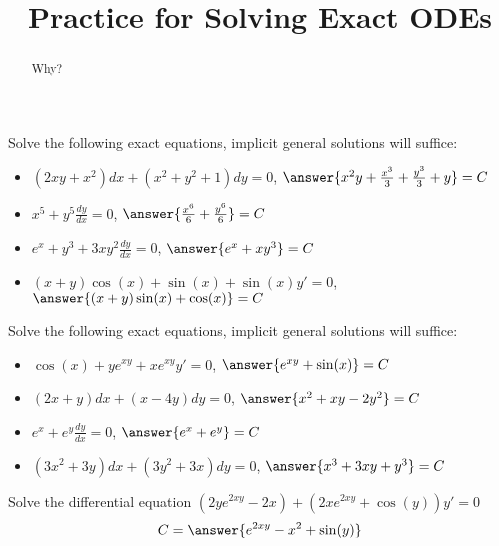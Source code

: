 \documentclass{ximera}
\title{Practice for Solving Exact ODEs}
\begin{document}
\begin{abstract}
    Why?
\end{abstract}
\maketitle

\begin{exercise}
    Solve the following exact equations, implicit general solutions will suffice:
    \begin{itemize}
        \item $(2 xy + x^2) dx + (x^2+y^2+1) dy = 0$, $\answer{x^2y + \frac{x^3}{3} + \frac{y^3}{3} + y} = C$
        \item $x^5 + y^5 \frac{dy}{dx} = 0$, $\answer{\frac{x^6}{6} + \frac{y^6}{6}} = C$
        \item $e^x+y^3 + 3xy^2 \frac{dy}{dx} = 0$, $\answer{e^x + xy^3} = C$
        \item $(x+y)\cos(x)+\sin(x) + \sin(x)y' = 0$, $\answer{(x+y)\sin(x) + \cos(x)} = C$
    \end{itemize}
\end{exercise}

\begin{exercise}%
    Solve the following exact equations, implicit general solutions will suffice:
    \begin{itemize}
        \item $\cos(x)+ye^{xy} + xe^{xy} y' = 0$, $\answer{e^{xy}+\sin(x)} = C$
        \item $(2x+y)dx + (x-4y) dy = 0$, $\answer{x^2+xy-2y^2} = C$
        \item $e^x + e^y \frac{dy}{dx} = 0$, $\answer{e^x+e^y} = C$
        \item $(3x^2+3y)dx + (3y^2+3x)dy = 0$, $\answer{x^3 + 3xy+ y^3} = C$
    \end{itemize}
\end{exercise}

\begin{exercise}
    Solve the differential equation $(2ye^{2xy} - 2x) + (2xe^{2xy} + \cos(y))y' = 0$
    \[
        C = \answer{e^{2xy} - x^2 + \sin(y)}
    \]
\end{exercise}
\end{document}
